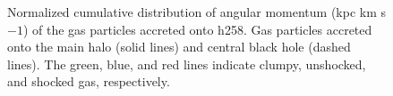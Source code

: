 \documentclass[]{emulateapj}
\begin{document}



\begin{figure}
\centerline{}
\caption[]{ Normalized cumulative distribution of angular momentum (kpc km s${{-1}}$) of the gas particles accreted onto h258.  Gas particles accreted onto the main halo (solid lines) and central black hole (dashed lines). The green, blue, and red lines indicate clumpy, unshocked, and shocked gas, respectively.}
\label{hrh258angmom} 
\end{figure}
\end{document}
